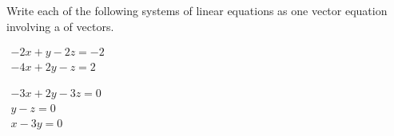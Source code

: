 \begin{exercise} \label{ex:syslc} 
Write each of the following systems of linear equations as one vector equation involving a  of vectors.
\begin{parts}
\item\label{ex:syslci} \(\begin{array}{l}
-2x+y-2z=-2\\
-4x+2y-z=2
\end{array}\)

\item\label{ex:syslcii} \(\begin{array}{l}
-3x+2y-3z=0\\
y-z=0\\
x-3y=0
\end{array}\)


\end{parts}
\end{exercise}
